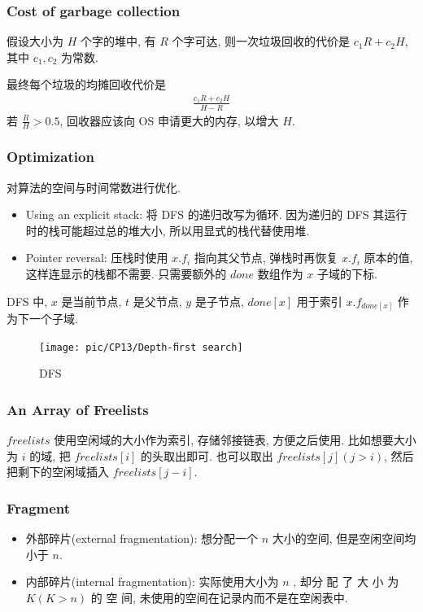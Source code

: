 \subsubsection{Cost of garbage collection}
假设大小为 $H$ 个字的堆中, 有 $R$ 个字可达, 则一次垃圾回收的代价是 $c_1R+c_2H$, 其中 $c_1, c_2$ 为常数. 

最终每个垃圾的均摊回收代价是 
\begin{align*}
    \frac{c_1R+c_2H}{H-R}
\end{align*}
若 $\frac{R}{H}>0.5$, 回收器应该向 OS 申请更大的内存, 以增大 $H$.

\subsubsection{Optimization}
对算法的空间与时间常数进行优化. 

\begin{itemize}
    \item Using an explicit stack: 将 DFS 的递归改写为循环. 因为递归的 DFS 其运行时的栈可能超过总的堆大小, 所以用显式的栈代替使用堆.
    \item Pointer reversal: 压栈时使用 $x.f_i$ 指向其父节点, 弹栈时再恢复 $x.f_i$ 原本的值, 这样连显示的栈都不需要. 只需要额外的 $done$ 数组作为 $x$ 子域的下标.
\end{itemize}

DFS 中, $x$ 是当前节点, $t$ 是父节点, $y$ 是子节点, $done[x]$ 用于索引 $x.f_{done[x]}$ 作为下一个子域. 

\begin{figure}[!htb]
    \centering
    \texttt{[image: pic/CP13/Depth-ﬁrst search]}
    \caption{DFS}
\end{figure}


\subsubsection{An Array of Freelists} 
$freelists$ 使用空闲域的大小作为索引, 存储邻接链表, 方便之后使用. 比如想要大小为 $i$ 的域, 把 $freelists[i]$ 的头取出即可. 也可以取出 $freelists[j](j>i)$, 然后把剩下的空闲域插入 $freelists[j-i]$.


\subsubsection{Fragment}
\begin{itemize}
    \item 外部碎片(external fragmentation): 想分配一个 $n$ 大小的空间, 但是空闲空间均小于 $n$.
    \item 内部碎片(internal fragmentation): 实际使用大小为 $n$ , 却分 配 了 大 小 为 $K(K>n)$ 的 空 间, 未使用的空间在记录内而不是在空闲表中.
\end{itemize}


